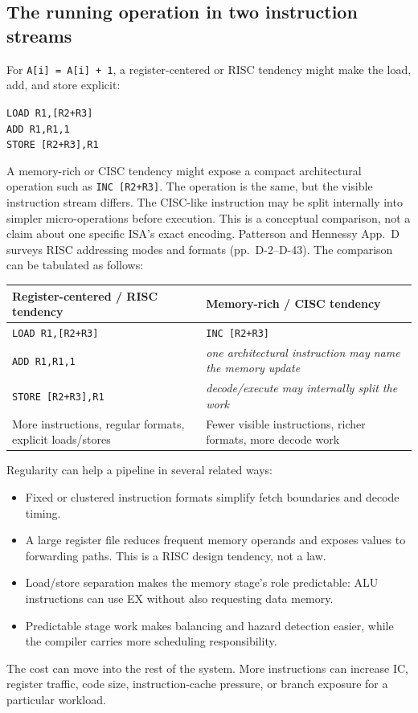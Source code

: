 \documentclass[11pt]{article}
\begin{document}
\subsection{The running operation in two instruction streams}

For \texttt{A[i] = A[i] + 1}, a register-centered or RISC tendency might make
the load, add, and store explicit:
\begin{center}
\texttt{LOAD R1,[R2+R3]}\\
\texttt{ADD R1,R1,1}\\
\texttt{STORE [R2+R3],R1}
\end{center}
A memory-rich or CISC tendency might expose a compact architectural operation
such as \texttt{INC [R2+R3]}. The operation is the same, but the visible
instruction stream differs. The CISC-like instruction may be split internally
into simpler micro-operations before execution. This is a conceptual
comparison, not a claim about one specific ISA's exact encoding. Patterson and
Hennessy App.~D surveys RISC addressing modes and formats (pp.~D-2--D-43).
The comparison can be tabulated as follows:
\begin{center}
\small
\begin{tabular}{@{}>{\raggedright\arraybackslash}p{5.6cm}>{\raggedright\arraybackslash}p{5.6cm}@{}}
\toprule
\textbf{Register-centered / RISC tendency} & \textbf{Memory-rich / CISC tendency}\\
\midrule
\texttt{LOAD R1,[R2+R3]} & \texttt{INC [R2+R3]}\\
\texttt{ADD R1,R1,1} & \textit{one architectural instruction may name the memory update}\\
\texttt{STORE [R2+R3],R1} & \textit{decode/execute may internally split the work}\\
More instructions, regular formats, explicit loads/stores & Fewer visible instructions, richer formats, more decode work\\
\bottomrule
\end{tabular}
\end{center}

Regularity can help a pipeline in several related ways:
\begin{itemize}
  \item Fixed or clustered instruction formats simplify fetch boundaries and
        decode timing.
  \item A large register file reduces frequent memory operands and exposes
        values to forwarding paths. This is a RISC design tendency, not a law.
  \item Load/store separation makes the memory stage's role predictable: ALU
        instructions can use EX without also requesting data memory.
  \item Predictable stage work makes balancing and hazard detection easier,
        while the compiler carries more scheduling responsibility.
\end{itemize}
The cost can move into the rest of the system. More instructions can increase
$\mathrm{IC}$, register traffic, code size, instruction-cache pressure, or
branch exposure for a particular workload.
\end{document}
